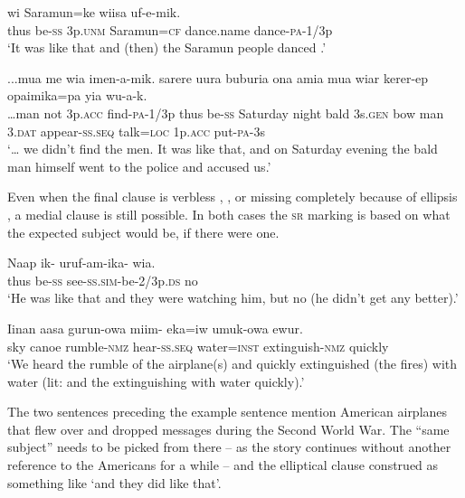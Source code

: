 \ea%
\label{ex:8:x1500}
\gll {}    wi  Saramun=ke  wiisa  uf-e-mik. \\
thus  be-\textsc{ss} 3p.\textsc{unm} Saramun=\textsc{cf} dance.name  dance-\textsc{pa}-1/3p      \\
\glt`It was like that and (then) the Saramun people danced .'
\z


\ea%
\label{ex:8:x1501}
\gll ...mua  me  wia  imen-a-mik.    sarere  uura buburia  ona  amia  mua  wiar  kerer-ep opaimika=pa  yia  wu-a-k.\\
{\dots}man  not  3p.\textsc{acc} find-\textsc{pa}-1/3p  thus  be-\textsc{ss} Saturday night bald 3s.\textsc{gen} bow  man 3.\textsc{dat} appear-\textsc{ss}.\textsc{seq} talk=\textsc{loc} 1p.\textsc{acc} put-\textsc{pa}-3s\\
\glt`{\dots} we didn't find the men. It was like that, and on Saturday evening the bald man himself went to the police and accused us.'
\z


Even when the final clause is verbless , , or missing completely because of ellipsis , a medial clause is still possible. In both cases the \textsc{sr} marking is based on what the expected subject would be, if there were one. 

\ea%
\label{ex:8:x1497}
\gll Naap  ik-  uruf-am-ika-  wia. \\
thus  be-\textsc{ss} see-\textsc{ss}.\textsc{sim}-be-2/3p.\textsc{ds}  no\\
\glt`He was like that and they were watching him, but no (he didn't get any better).'
\z


\ea%
\label{ex:8:x1498}
\gll Iinan  aasa  gurun-owa  miim-  eka=iw  umuk-owa ewur. \\
sky  canoe  rumble-\textsc{nmz} hear-\textsc{ss}.\textsc{seq} water=\textsc{inst} extinguish-\textsc{nmz} quickly\\
\glt`We heard the rumble of the airplane(s) and quickly extinguished (the fires) with water (lit: and the extinguishing with water quickly).'
\z


The two sentences preceding the example sentence  mention American airplanes that flew over and dropped messages during the Second World War. The ``same subject'' needs to be picked from there -- as the story continues without another reference to the Americans for a while -- and the elliptical clause construed as something like  `and they did like that'.

